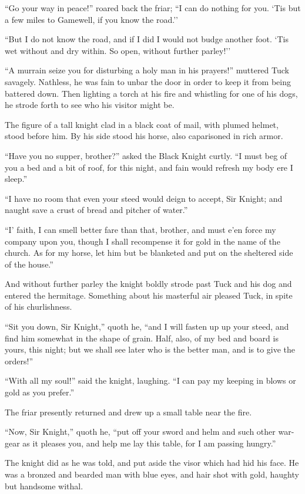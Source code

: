 ``Go your way in peace!'' roared back the friar; ``I can do nothing for
you. `Tis but a few miles to Gamewell, if you know the road.''

``But I do not know the road, and if I did I would not budge another
foot. `Tis wet without and dry within. So open, without further
parley!''

``A murrain seize you for disturbing a holy man in his prayers!''
muttered Tuck savagely. Nathless, he was fain to unbar the door in order
to keep it from being battered down. Then lighting a torch at his fire
and whistling for one of his dogs, he strode forth to see who his
visitor might be.

The figure of a tall knight clad in a black coat of mail, with plumed
helmet, stood before him. By his side stood his horse, also caparisoned
in rich armor.

``Have you no supper, brother?'' asked the Black Knight curtly. ``I must
beg of you a bed and a bit of roof, for this night, and fain would
refresh my body ere I sleep.''

``I have no room that even your steed would deign to accept, Sir Knight;
and naught save a crust of bread and pitcher of water.''

``I' faith, I can smell better fare than that, brother, and must e'en
force my company upon you, though I shall recompense it for gold in the
name of the church. As for my horse, let him but be blanketed and put on
the sheltered side of the house.''

And without further parley the knight boldly strode past Tuck and his
dog and entered the hermitage. Something about his masterful air pleased
Tuck, in spite of his churlishness.

``Sit you down, Sir Knight,'' quoth he, ``and I will fasten up up your
steed, and find him somewhat in the shape of grain. Half, also, of my
bed and board is yours, this night; but we shall see later who is the
better man, and is to give the orders!''

``With all my soul!'' said the knight, laughing. ``I can pay my keeping
in blows or gold as you prefer.''

The friar presently returned and drew up a small table near the fire.

``Now, Sir Knight,'' quoth he, ``put off your sword and helm and such
other war-gear as it pleases you, and help me lay this table, for I am
passing hungry.''

The knight did as he was told, and put aside the visor which had hid his
face. He was a bronzed and bearded man with blue eyes, and hair shot
with gold, haughty but handsome withal.

